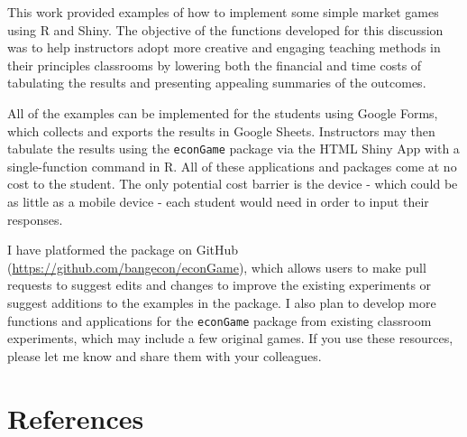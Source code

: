 \documentclass[
]{article}
\begin{document}
This work provided examples of how to implement some simple market games
using R and Shiny. The objective of the functions developed for this
discussion was to help instructors adopt more creative and engaging
teaching methods in their principles classrooms by lowering both the
financial and time costs of tabulating the results and presenting
appealing summaries of the outcomes.

All of the examples can be implemented for the students using Google
Forms, which collects and exports the results in Google Sheets.
Instructors may then tabulate the results using the \texttt{econGame}
package via the HTML Shiny App with a single-function command in R. All
of these applications and packages come at no cost to the student. The
only potential cost barrier is the device - which could be as little as
a mobile device - each student would need in order to input their
responses.

I have platformed the package on GitHub
(\url{https://github.com/bangecon/econGame}), which allows users to make
pull requests to suggest edits and changes to improve the existing
experiments or suggest additions to the examples in the package. I also
plan to develop more functions and applications for the
\texttt{econGame} package from existing classroom experiments, which may
include a few original games. If you use these resources, please let me
know and share them with your colleagues.

\hypertarget{references}{%
\section*{References}\label{references}}
\end{document}
